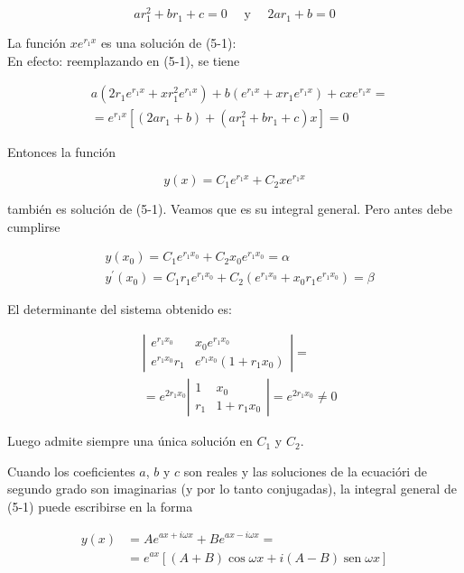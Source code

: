 \documentclass[10pt]{article}
\theoremstyle{plain}
\theoremstyle{definition}
\theoremstyle{remark}
\begin{document}
$$
a r_{1}^{2}+b r_{1}+c=0 \quad \text { y } \quad 2 a r_{1}+b=0
$$

La función $x e^{r_{1} x}$ es una solución de (5-1):\\
En efecto: reemplazando en (5-1), se tiene

$$
\begin{aligned}
& a\left(2 r_{1} e^{r_{1} x}+x r_{1}^{2} e^{r_{1} x}\right)+b\left(e^{r_{1} x}+x r_{1} e^{r_{1} x}\right)+c x e^{r_{1} x}= \\
& =e^{r_{1} x}\left[\left(2 a r_{1}+b\right)+\left(a r_{1}^{2}+b r_{1}+c\right) x\right]=0
\end{aligned}
$$

Entonces la función

$$
y(x)=C_{1} e^{r_{1} x}+C_{2} x e^{r_{1} x}
$$

también es solución de (5-1). Veamos que es su integral general. Pero antes debe cumplirse

$$
\begin{aligned}
& y\left(x_{0}\right)=C_{1} e^{r_{1} x_{0}}+C_{2} x_{0} e^{r_{1} x_{0}}=\alpha \\
& y^{\prime}\left(x_{0}\right)=C_{1} r_{1} e^{r_{1} x_{0}}+C_{2}\left(e^{r_{1} x_{0}}+x_{0} r_{1} e^{r_{1} x_{0}}\right)=\beta
\end{aligned}
$$

El determinante del sistema obtenido es:

$$
\begin{aligned}
& \left|\begin{array}{cc}
e^{r_{1} x_{0}} & x_{0} e^{r_{1} x_{0}} \\
e^{r_{1} x_{0}} r_{1} & e^{r_{1} x_{0}}\left(1+r_{1} x_{0}\right)
\end{array}\right|= \\
& =e^{2 r_{1} x_{0}}\left|\begin{array}{cc}
1 & x_{0} \\
r_{1} & 1+r_{1} x_{0}
\end{array}\right|=e^{2 r_{1} x_{0}} \neq 0
\end{aligned}
$$

Luego admite siempre una única solución en $C_{1}$ y $C_{2}$.

Cuando los coeficientes $a$, $b$ y $c$ son reales y las soluciones de la ecuacióri de segundo grado son imaginarias (y por lo tanto conjugadas), la integral general de (5-1) puede escribirse en la forma

$$
\begin{aligned}
y(x) & =A e^{a x+i \omega x}+B e^{a x-i \omega x}= \\
& =e^{a x}[(A+B) \cos \omega x+i(A-B) \operatorname{sen} \omega x]
\end{aligned}
$$
\end{document}
